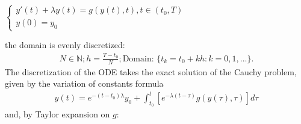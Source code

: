 \documentclass[letterpaper,10pt,english]{jupyterBook}
\begin{document}
\sphinxAtStartPar
\(\begin{cases}
    y'(t) + \lambda y(t) = g(y(t), t), t \in (t_0, T) \\
    y(0) = y_0
\end{cases}\)

\sphinxAtStartPar
the domain is evenly discretized:
\begin{equation*}
\begin{split}
    N \in \mathbb{N}; h = \frac{T-t_0}{N}; \text{Domain: }\{t_k = t_0 + k h : k = 0, 1, ...\}.
\end{split}
\end{equation*}
\sphinxAtStartPar
The discretization of the ODE takes the exact solution of the Cauchy problem, given by the variation of constants formula
\begin{equation*}
\begin{split}
    y(t) = e^{-(t-t_0) \lambda}y_0 + \int_{t_0}^t [e^{-\lambda(t-\tau)} g(y(\tau), \tau)] d\tau
\end{split}
\end{equation*}
\sphinxAtStartPar
and, by Taylor expansion on \(g\):
\end{document}
